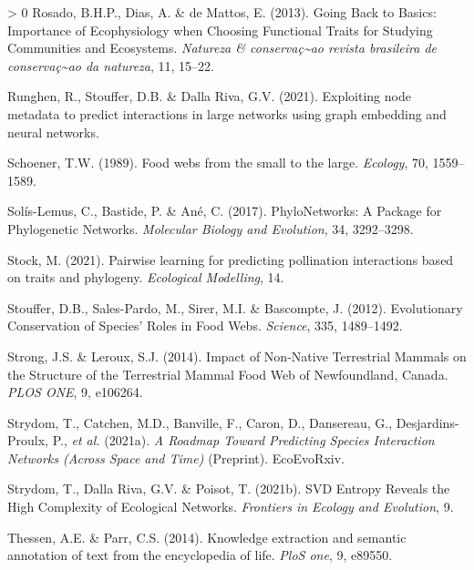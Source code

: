 \documentclass[11pt]{article}
\newlength{\cslhangindent}
\newenvironment{CSLReferences}[3] %
 {%
  \setlength{\parindent}{0pt}
  \ifodd #1 \everypar{\setlength{\hangindent}{\cslhangindent}}\ignorespaces\fi
  \ifnum #2 > 0
  \setlength{\parskip}{#2\baselineskip}
  \fi
 }%
 {}
\begin{document}
\begin{CSLReferences}{1}{0}
\leavevmode\hypertarget{ref-Rosado2013GoiBac}{}%
Rosado, B.H.P., Dias, A. \& de Mattos, E. (2013). Going Back to Basics:
Importance of Ecophysiology when Choosing Functional Traits for Studying
Communities and Ecosystems. \emph{Natureza \&
conservaç\textasciitilde ao revista brasileira de
conservaç\textasciitilde ao da natureza}, 11, 15--22.

\leavevmode\hypertarget{ref-Runghen2021ExpNod}{}%
Runghen, R., Stouffer, D.B. \& Dalla Riva, G.V. (2021). Exploiting node
metadata to predict interactions in large networks using graph embedding
and neural networks.

\leavevmode\hypertarget{ref-Schoener1989FooWeb}{}%
Schoener, T.W. (1989). Food webs from the small to the large.
\emph{Ecology}, 70, 1559--1589.

\leavevmode\hypertarget{ref-Solis-Lemus2017PhyPac}{}%
Solís-Lemus, C., Bastide, P. \& Ané, C. (2017). PhyloNetworks: A Package
for Phylogenetic Networks. \emph{Molecular Biology and Evolution}, 34,
3292--3298.

\leavevmode\hypertarget{ref-Stock2021PaiLea}{}%
Stock, M. (2021). Pairwise learning for predicting pollination
interactions based on traits and phylogeny. \emph{Ecological Modelling},
14.

\leavevmode\hypertarget{ref-Stouffer2012EvoCon}{}%
Stouffer, D.B., Sales-Pardo, M., Sirer, M.I. \& Bascompte, J. (2012).
Evolutionary Conservation of Species' Roles in Food Webs.
\emph{Science}, 335, 1489--1492.

\leavevmode\hypertarget{ref-Strong2014ImpNon}{}%
Strong, J.S. \& Leroux, S.J. (2014). Impact of Non-Native Terrestrial
Mammals on the Structure of the Terrestrial Mammal Food Web of
Newfoundland, Canada. \emph{PLOS ONE}, 9, e106264.

\leavevmode\hypertarget{ref-Strydom2021RoaPre}{}%
Strydom, T., Catchen, M.D., Banville, F., Caron, D., Dansereau, G.,
Desjardins-Proulx, P., \emph{et al.} (2021a). \emph{A Roadmap Toward
Predicting Species Interaction Networks (Across Space and Time)}
(Preprint). EcoEvoRxiv.

\leavevmode\hypertarget{ref-Strydom2021SvdEnt}{}%
Strydom, T., Dalla Riva, G.V. \& Poisot, T. (2021b). SVD Entropy Reveals
the High Complexity of Ecological Networks. \emph{Frontiers in Ecology
and Evolution}, 9.

\leavevmode\hypertarget{ref-Thessen2014KnoExt}{}%
Thessen, A.E. \& Parr, C.S. (2014). Knowledge extraction and semantic
annotation of text from the encyclopedia of life. \emph{PloS one}, 9,
e89550.


\end{CSLReferences}
\end{document}

